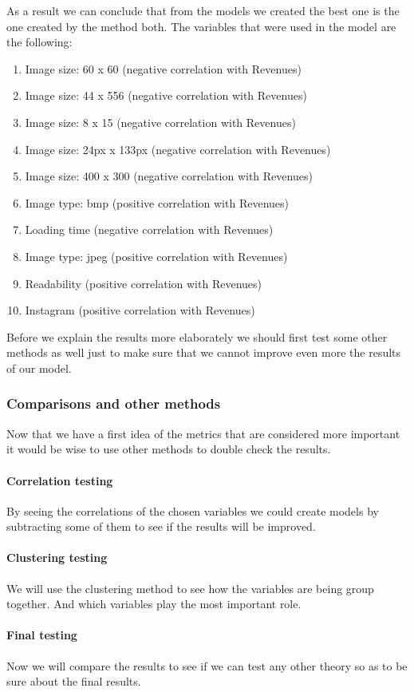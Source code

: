 \documentclass{article}
\begin{document}
As a result we can conclude that from the models we created the best one is the one created by the method both. The variables that were used in the model are the following:
\begin{enumerate}
\item Image size: 60 x 60 (negative correlation with Revenues)
\item Image size: 44 x 556 (negative correlation with Revenues)
\item Image size: 8 x 15 (negative correlation with Revenues)
\item Image size: 24px x 133px (negative correlation with Revenues)
\item Image size: 400 x 300 (negative correlation with Revenues)
\item Image type: bmp (positive correlation with Revenues)
\item Loading time (negative correlation with Revenues)
\item Image type: jpeg (positive correlation with Revenues)
\item Readability (positive correlation with Revenues)
\item Instagram (positive correlation with Revenues) 
\end{enumerate}
Before we explain the results more elaborately we should first test some other methods as well just to make sure that we cannot improve even more the results of our model.
\subsubsection{Comparisons and other methods}
Now that we have a first idea of the metrics that are considered more important it would be wise to use other methods to double check the results.
\paragraph{Correlation testing}
By seeing the correlations of the chosen variables we could create models by subtracting some of them to see if the results will be improved.
\paragraph{Clustering testing}
We will use the clustering method to see how the variables are being group together. And which variables play the most important role.
\paragraph{Final testing}
Now we will compare the results to see if we can test any other theory so as to be sure about the final results.
\end{document}

